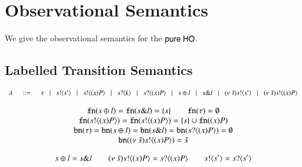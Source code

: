 \section{Observational Semantics}

We give the observational semantics for the $\mathsf{pure\ HO}$.

\subsection{Labelled Transition Semantics}

\[
	\begin{array}{rcl}
		\lambda &\;\;::=\;\;& \tau \;\;\;|\;\;\; s ! \langle s' \rangle \;\;\;|\;\;\; s ! \langle (x)P \rangle \;\;\;|\;\;\; s ? \langle k \rangle \;\;\;|\;\;\; s ? \langle (x)P \rangle
			\;\;\;|\;\;\; s \oplus l \;\;\;|\;\;\; s \& l \;\;\;|\;\;\; (\nu\ \tilde{s}) s ! \langle s' \rangle \;\;\;|\;\;\; (\nu\ \tilde{s}) s ! \langle (x)P \rangle\\
	\end{array}
\]

\[
	\begin{array}{c}
		\mathtt{fn}(s \oplus l) = \mathtt{fn}(s \& l) = \{s\} \qquad \mathtt{fn}(\tau) = \emptyset \\ 
		\mathtt{fn}(s ! \langle (x)P \rangle) = \mathtt{fn}(s ! \langle (x)P \rangle) = \{s\} \cup \mathtt{fn}((x)P)\\
		\mathtt{bn}(\tau) = \mathtt{bn}(s \oplus l) = \mathtt{bn}(s \& l) = \mathtt{bn}(s ? \langle (x)P \rangle) = \emptyset\\
		\mathtt{bn}((\nu\ \tilde{s}) s ! \langle (x)P \rangle) = \tilde{s}
	\end{array}
\]

\[
	s \oplus l \asymp s \& l \qquad (\nu\ \tilde{s}) s ! \langle (x)P \rangle \asymp s ? \langle (x)P \rangle \qquad s ! \langle s' \rangle \asymp s ? \langle s' \rangle
\]


